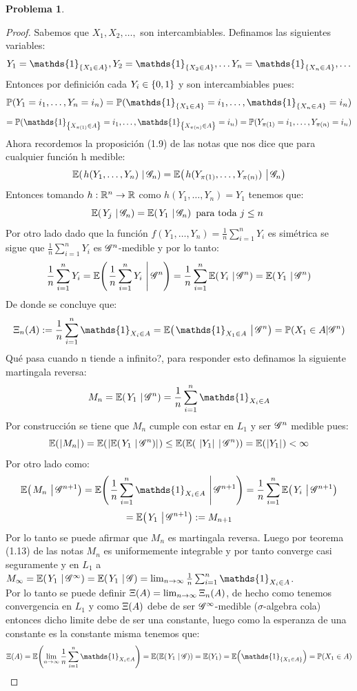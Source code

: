\documentclass[a5paper,oneside]{amsart}
\theoremstyle{plain}
\theoremstyle{definition}
\newtheorem{problema}{Problema}
\begin{document}
\begin{problema}
\begin{enumerate}
\begin{proof}
Sabemos que $X_1,X_2,\ldots, $ son intercambiables. Definamos las siguientes variables:
$$
Y_1=\mathds{1}_{\set{X_1 \in A}},Y_2=\mathds{1}_{\set{X_2 \in A}},\ldots Y_n=\mathds{1}_{\set{X_n \in A}},\ldots
$$
Entonces por definici\'on cada $Y_i \in \left\{ 0,1\right\} $ y son intercambiables pues:
$$
\p(Y_1=i_1,\ldots ,Y_n=i_n)=\p(\mathds{1}_{\set{X_1 \in A}}=i_1,\ldots , \mathds{1}_{\set{X_n \in A}}=i_n)
$$
$$
=\p(\mathds{1}_{\set{X_{\pi(1)} \in A}}=i_1,\ldots , \mathds{1}_{\set{X_{\pi(n)} \in A}}=i_n)= \p(Y_{\pi(1)}=i_1,\ldots ,Y_{\pi(n)}=i_n)
$$
Ahora recordemos la proposici\'on (1.9) de las notas que nos dice que para cualquier funci\'on h medible:
$$
\espc{h(Y_1,\ldots,Y_n)}{\G_n}=\espc{h(Y_{\pi(1)},\ldots,Y_{\pi(n)})}{\G_n}
$$
Entonces tomando $h:\mathbb{R}^n \rightarrow \mathbb{R}$  como $h(Y_1,\ldots,Y_n)=Y_1$ tenemos que:
$$
\espc{Y_j}{\G_n}=\espc{Y_1}{\G_n} \text{ para toda $j \leq n$ }
$$
Por otro lado dado que la funci\'on $f(Y_1,\ldots,Y_n)=\frac{1}{n}\sum_{i=1}^{n}Y_i$ es sim\'etrica se sigue que $\frac{1}{n}\sum_{i=1}^{n}Y_i$ es $\mathscr{G}^n$-medible y por lo tanto:
$$
 \frac{1}{n}\sum_{i=1}^{n}Y_i=\espc{\frac{1}{n}\sum_{i=1}^{n}Y_i}{\G^n}=\frac{1}{n}\sum_{i=1}^{n}\espc{Y_i}{\G^n}=\espc{Y_1}{\G^n}
$$
De donde se concluye que:
$$
\imf{\Xi_n}{A}:= \frac{1}{n}\sum_{i=1}^{n}\mathds{1}_{X_i\in A}=\espc{\mathds{1}_{X_1 \in A}}{\G^n}=\p(X_1 \in A| \G^n)
$$
Qu\'e pasa cuando n tiende a infinito?, para responder esto definamos la siguiente martingala reversa:
$$
M_n=\espc{Y_1}{\G^n}=\frac{1}{n}\sum_{i=1}^{n}\mathds{1}_{X_i\in A}
$$
Por construcci\'on se tiene que $M_n$ cumple con estar en $L_1$ y ser $\mathscr{G}^n$ medible pues:
$$
\esp{\abs{M_n}}=\esp{\abs{\espc{Y_1}{\G^n}}}\leq \esp{\espc{\abs{Y_1}}{\G^n}} =\esp{\abs{Y_1}} < \infty
$$
Por otro lado como:
$$
\espc{M_n}{\G^{n+1}}=\espc{\frac{1}{n}\sum_{i=1}^{n}\mathds{1}_{X_i\in A}}{\G^{n+1}}=\frac{1}{n}\sum_{i=1}^{n}\espc{Y_i}{\G^{n+1}}
$$
$$
=\espc{Y_1}{\G^{n+1}}:=M_{n+1}
$$
Por  lo tanto se puede afirmar que $M_n$ es martingala reversa. Luego por teorema (1.13) de las notas $M_n$ es uniformemente integrable y por tanto  converge casi seguramente y en $L_1$ a $M_{\infty}=\espc{Y_1}{\G^\infty}=\espc{Y_1}{\G}=\lim_{n \rightarrow \infty} \frac{1}{n}\sum_{i=1}^{n}\mathds{1}_{X_i\in A}$.\\
Por lo tanto se puede definir $\Xi\!\left( A\right) =\lim_{n\to\infty}\Xi_n\!\left( A\right) $, de hecho como tenemos convergencia en $L_1$ y como $\Xi\!\left( A\right) $ debe de ser $\mathscr{G}^\infty$-medible ($\sigma$-algebra cola) entonces dicho limite debe de ser una constante, luego como la esperanza de una constante es la constante misma tenemos que:
$$
\imf{\Xi}{A}=\esp{\lim_{n \rightarrow \infty} \frac{1}{n}\sum_{i=1}^{n}\mathds{1}_{X_i\in A}}=\esp{\espc{Y_1}{\G}}=\esp{Y_1}=\esp{\mathds{1}_{\set{X_1 \in A}}}=\p(X_1 \in A)
$$
\end{proof}



\end{enumerate}
\end{problema}
\end{document}
